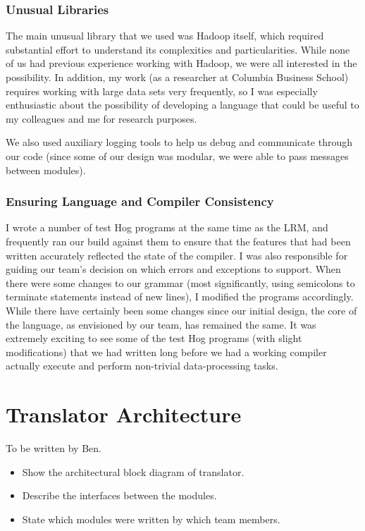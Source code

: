 \documentclass{report}
\begin{document}
\subsection{Unusual Libraries}

The main unusual library that we used was Hadoop itself, which required substantial effort to understand its complexities and particularities. While none of us had previous experience working with Hadoop, we were all interested in the possibility. In addition, my work (as a researcher at Columbia Business School) requires working with large data sets very frequently, so I was especially enthusiastic about the possibility of developing a language that could be useful to my colleagues and me for research purposes.

We also used auxiliary logging tools to help us debug and communicate through our code (since some of our design was modular, we were able to pass messages between modules).

\subsection{Ensuring Language and Compiler Consistency}

I wrote a number of test Hog programs at the same time as the LRM, and frequently ran our build against them to ensure that the features that had been written accurately reflected the state of the compiler. I was also responsible for guiding our team's decision on which errors and exceptions to support. When there were some changes to our grammar (most significantly, using semicolons to terminate statements instead of new lines), I modified the programs accordingly. While there have certainly been some changes since our initial design, the core of the language, as envisioned by our team, has remained the same. It was extremely exciting to see some of the test Hog programs (with slight modifications) that we had written long before we had a working compiler actually execute and perform non-trivial data-processing tasks. 

\chapter{Translator Architecture}
\label{chap:trans}

To be written by Ben.

\begin{itemize}
\item Show the architectural block diagram of translator.
\item Describe the interfaces between the modules.
\item State which modules were written by which team members.
\end{itemize}
\end{document}
